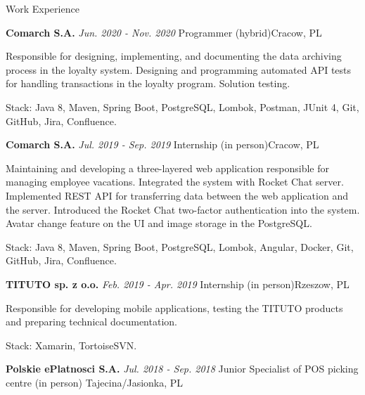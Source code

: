\documentclass{resume}
\begin{document}
\begin{rSection}{Work Experience}
\begin{rSubsection}
    \end{rSubsection}

    \begin{rSubsection}
        {\bf Comarch S.A.}
        {\em Jun. 2020 - Nov. 2020}
        {\normalfont Programmer (hybrid)}{Cracow, PL}

        \item[] {Responsible for designing, implementing, and documenting the data archiving process in the loyalty system. Designing and programming
                    automated API tests for handling transactions in the loyalty program. Solution testing.}
        \item[] {Stack: Java 8, Maven, Spring Boot, PostgreSQL, Lombok, Postman, JUnit 4, Git, GitHub, Jira, Confluence.}

    \end{rSubsection}

    \begin{rSubsection}
        {\bf Comarch S.A.}
        {\em Jul. 2019 - Sep. 2019}
        {\normalfont Internship (in person)}{Cracow, PL}

        \item[] {Maintaining and developing a three-layered web application responsible for managing employee vacations.
                    Integrated the system with Rocket Chat server. Implemented REST API for transferring data between the web
                    application and the server. Introduced the Rocket Chat two-factor authentication into the system.
                    Avatar change feature on the UI and image storage in the PostgreSQL.}
        \item[] {Stack: Java 8, Maven, Spring Boot, PostgreSQL, Lombok, Angular, Docker, Git, GitHub, Jira, Confluence.}

    \end{rSubsection}

    \begin{rSubsection}
        {\bf TITUTO sp. z o.o.}
        {\em Feb. 2019 - Apr. 2019}
        {\normalfont Internship (in person)}{Rzeszow, PL}

        \item[] {Responsible for developing mobile applications, testing the TITUTO products and preparing technical documentation.}
        \item[] {Stack: Xamarin, TortoiseSVN.}

    \end{rSubsection}

    \begin{rSubsection}
        {\bf Polskie ePlatnosci S.A.}
        {\em Jul. 2018 - Sep. 2018}
        {\normalfont Junior Specialist of POS picking centre (in person)}
        {Tajecina/Jasionka, PL}


\end{rSubsection}
\end{rSection}
\end{document}
